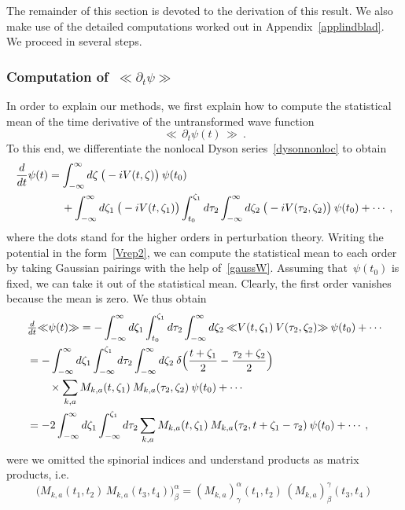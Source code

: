 \documentclass[reqno,11pt]{amsart}
\numberwithin{equation}{section}
\newcommand{\bbra}{\mathopen{\ll}}
\newcommand{\kket}{\mathclose{\gg}}
\newcommand{\1}{\mathds{1}}
\begin{document}
The remainder of this section is devoted to the derivation of this result.
We also make use of the detailed computations worked out in Appendix~\ref{applindblad}.
We proceed in several steps.
\subsubsection{Computation of~$\bbra \partial_t \psi \kket$} \label{sectpsi}
 In order to explain our methods, we first explain how to compute
the statistical mean of the time derivative of the untransformed wave function
\[ \bbra \,\partial_t \psi(t)\, \kket \:. \]
To this end, we differentiate the nonlocal Dyson series~\eqref{dysonnonloc} to obtain
\begin{align*}
\frac{d}{dt} \psi(t) &= 
\int_{-\infty}^\infty d\zeta\: \big(-i V(t, \zeta) \big)\: \psi(t_0) \notag \\
&\quad\: + \int_{-\infty}^\infty d\zeta_1\: \big(-i V(t, \zeta_1) \big)
\int_{t_0}^{\zeta_1} d\tau_2 \int_{-\infty}^\infty d\zeta_2\: \big(-i V(\tau_2, \zeta_2) \big)\: \psi(t_0) 
+ \cdots \:,
\end{align*}
where the dots stand for the higher orders in perturbation theory.
Writing the potential in the form~\eqref{Vrep2}, we can compute the statistical mean to each order
by taking Gaussian pairings with the help of~\eqref{gaussW}.
Assuming that~$\psi(t_0)$ is fixed, we can take it out of the statistical mean.
Clearly, the first order vanishes because the mean is zero. We thus obtain
\begin{align}
&\tfrac{d}{dt} \bbra \psi(t) \kket = - \int_{-\infty}^\infty d\zeta_1
\int_{t_0}^{\zeta_1} d\tau_2 \int_{-\infty}^\infty d\zeta_2\: 
\bbra V(t, \zeta_1)\: V(\tau_2, \zeta_2) \kket\: \psi(t_0) + \cdots \notag \\
&= -\int_{-\infty}^\infty d\zeta_1 \int_{-\infty}^{\zeta_1} d\tau_2 \int_{-\infty}^\infty d\zeta_2 
\:\delta \Big( \frac{t+\zeta_1}{2} - \frac{\tau_2+\zeta_2}{2} \Big) \notag \\
&\qquad \times \sum_{k,a}
M_{k,a}( t, \zeta_1)\: M_{k,a}( \tau_2, \zeta_2)\: \psi(t_0) + \cdots \notag \\
&= -2 \int_{-\infty}^\infty d\zeta_1 \int_{-\infty}^{\zeta_1} d\tau_2 
\sum_{k,a} M_{k,a}(t,\zeta_1)\: M_{k,a}(\tau_2, t+\zeta_1 - \tau_2) \: \psi(t_0) + \cdots \:, \label{resum}
\end{align}
were we omitted the spinorial indices and understand products as matrix products, i.e.\
\[ \big(M_{k,a}(t_1, t_2)\, M_{k,a}(t_3, t_4) \big)^\alpha_\beta = (M_{k,a})^\alpha_\gamma(t_1,t_2)\, (M_{k,a})^\gamma_\beta (t_3,t_4) \]
\end{document}
